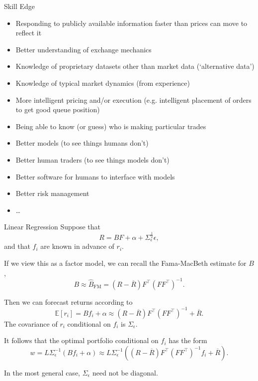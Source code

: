 \documentclass{beamer}
\begin{document}
\begin{frame}{Skill Edge}
	\begin{itemize}
		\item Responding to publicly available information faster than prices can move to reflect it
		\item Better understanding of exchange mechanics
		\item Knowledge of proprietary datasets other than market data (`alternative data')
		\item Knowledge of typical market dynamics (from experience)
		\item More intelligent pricing and/or execution (e.g. intelligent placement of orders to get good queue position)
		\item Being able to know (or guess) who is making particular trades
		\item Better models (to see things humans don't)
		\item Better human traders (to see things models don't)
		\item Better software for humans to interface with models
		\item Better risk management
		\item \ldots
	\end{itemize}
\end{frame}

\begin{frame}{Linear Regression}
	Suppose that	
	$$R = B F + \alpha + \Sigma_\epsilon^\frac{1}{2}\epsilon,$$
	and that $f_i$ are known in advance of $r_i$.

	If we view this as a factor model, we can recall the Fama-MacBeth estimate for $B$,
	$$B \approx \hat{B}_{\textrm{FM}} = (R-\overline{R})F^\top (FF^\top)^{-1}.$$

	Then we can forecast returns according to
	$$\mathbb{E}[r_i] = B f_i + \alpha \approx (R-\overline{R})F^\top (FF^\top)^{-1} + \overline{R}.$$
	The covariance of $r_i$ conditional on $f_i$ is $\Sigma_\epsilon$.

	It follows that the optimal portfolio conditional on $f_i$ has the form
	$$w = L \Sigma_\epsilon^{-1} (B f_i + \alpha) \approx L \Sigma_\epsilon^{-1} ((R-\overline{R})F^\top (FF^\top)^{-1}f_i+\overline{R}).$$%

	In the most general case, $\Sigma_\epsilon$ need not be diagonal.
\end{frame}
\end{document}
